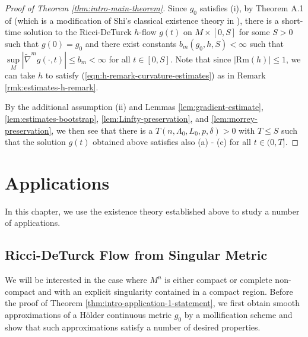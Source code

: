 \documentclass[12pt]{amsart}
\theoremstyle{plain}
\theoremstyle{plain}
\theoremstyle{definition}
\theoremstyle{remark}
\numberwithin{equation}{subsection}
\newcommand{\hdel}{\tilde{\nabla}}
\begin{document}
\begin{proof}[Proof of Theorem \ref{thm:intro-main-theorem}]
    Since $g_0$ satisfies (i), by Theorem A.1 of \cite{lamm_ricci_2021} (which is a modification of Shi's classical existence theory in \cite{shi_deforming_1989}), there is a short-time solution to the Ricci-DeTurck $h$-flow $g(t)$ on $M \times [0,S]$ for some $S > 0$ such that $g(0) = g_0$ and there exist constants $b_m(g_0, h, S) < \infty$ such that $\sup\limits_M |\hdel^m g(\cdot, t)| \leq b_m < \infty$ for all $t \in [0, S]$. Note that since $|\text{Rm}(h)|\leq 1$, we can take $h$ to satisfy (\ref{eqn:h-remark-curvature-estimates}) as in Remark \ref{rmk:estimates-h-remark}.

    By the additional assumption (ii) and Lemmas \ref{lem:gradient-estimate}, \ref{lem:estimates-bootstrap}, \ref{lem:Linfty-preservation}, and \ref{lem:morrey-preservation}, we then see that there is a $T(n, \Lambda_0, L_0, p, \delta) > 0$ with $T \leq S$ such that the solution $g(t)$ obtained above satisfies also (a) - (c) for all $t \in (0, T]$.
\end{proof}

\section{Applications}\label{sec:applications}

In this chapter, we use the existence theory established above to study a number of applications.

\subsection{Ricci-DeTurck Flow from Singular Metric}

We will be interested in the case where $M^n$ is either compact or complete non-compact and with an explicit singularity contained in a compact region. Before the proof of Theorem \ref{thm:intro-application-1-statement}, we first obtain smooth approximations of a H\"older continuous metric $g_0$ by a mollification scheme and show that such approximations satisfy a number of desired properties.
\end{document}
